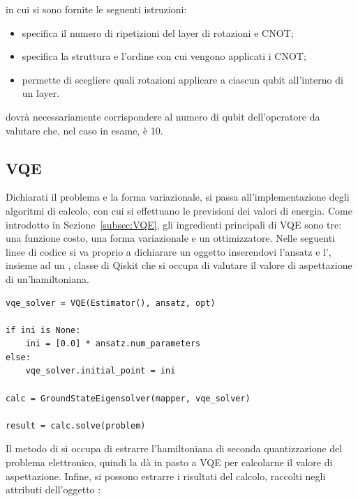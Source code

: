 in cui si sono fornite le seguenti istruzioni:

\begin{itemize}
\item {} specifica il numero di ripetizioni del layer di rotazioni e CNOT;
\item {} specifica la struttura e l'ordine con cui vengono applicati i CNOT;
\item {} permette di scegliere quali rotazioni applicare a ciascun qubit all'interno di un layer.
\end{itemize}

 dovrà necessariamente corrispondere al numero di qubit dell'operatore da valutare che, nel caso in esame, è 10.


\subsection{VQE}

Dichiarati il problema e la forma variazionale, si passa all'implementazione degli algoritmi di calcolo, con cui si effettuano le previsioni dei valori di energia. Come introdotto in Sezione~\ref{subsec:VQE}, gli ingredienti principali di VQE sono tre: una funzione costo, una forma variazionale e un ottimizzatore. Nelle seguenti linee di codice si va proprio a dichiarare un oggetto  inserendovi l'ansatz e l', insieme ad un , classe di Qiskit che si occupa di valutare il valore di aspettazione di un'hamiltoniana.

\begin{tcolorbox}[title=Implementazione VQE]
\begin{lstlisting}
vqe_solver = VQE(Estimator(), ansatz, opt)

if ini is None:
    ini = [0.0] * ansatz.num_parameters
else:
    vqe_solver.initial_point = ini

calc = GroundStateEigensolver(mapper, vqe_solver)

result = calc.solve(problem)
\end{lstlisting}
\vspace{-0.2cm}
\end{tcolorbox}

Il metodo  di  si occupa di estrarre l'hamiltoniana di seconda quantizzazione del problema elettronico, quindi la dà in pasto a VQE per calcolarne il valore di aspettazione. Infine, si possono estrarre i risultati del calcolo, raccolti negli attributi dell'oggetto :

